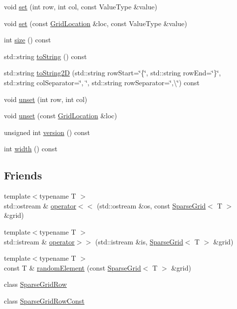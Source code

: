 \begin{DoxyCompactItemize}
\item 
void \mbox{\hyperlink{classSparseGrid_a6f5cee26d171f36d280a15c51332efc2}{set}} (int row, int col, const Value\+Type \&value)
\item 
void \mbox{\hyperlink{classSparseGrid_a02a61287a9aee6a1ff7e8a8325ce094d}{set}} (const \mbox{\hyperlink{structGridLocation}{Grid\+Location}} \&loc, const Value\+Type \&value)
\item 
int \mbox{\hyperlink{classSparseGrid_af9593d4a5ff4274efaf429cb4f9e57cc}{size}} () const
\item 
std\+::string \mbox{\hyperlink{classSparseGrid_a1fe5121d6528fdea3f243321b3fa3a49}{to\+String}} () const
\item 
std\+::string \mbox{\hyperlink{classSparseGrid_a8e636ad8b56218c7e0162d6c1bd78b39}{to\+String2D}} (std\+::string row\+Start=\char`\"{}\{\char`\"{}, std\+::string row\+End=\char`\"{}\}\char`\"{}, std\+::string col\+Separator=\char`\"{}, \char`\"{}, std\+::string row\+Separator=\char`\"{},\textbackslash{}\char`\"{}) const
\item 
void \mbox{\hyperlink{classSparseGrid_ae8cd7ce6866d5bccb4d900047b00a9f0}{unset}} (int row, int col)
\item 
void \mbox{\hyperlink{classSparseGrid_a6c6a0cedc17fead9553340c164db6eb3}{unset}} (const \mbox{\hyperlink{structGridLocation}{Grid\+Location}} \&loc)
\item 
unsigned int \mbox{\hyperlink{classSparseGrid_a0aa696ccb72cbf928535d6b646bac1aa}{version}} () const
\item 
int \mbox{\hyperlink{classSparseGrid_ad72663daf610f2a0833a2fc3d78e4fdf}{width}} () const
\end{DoxyCompactItemize}
\subsection*{Friends}
\begin{DoxyCompactItemize}
\item 
{\footnotesize template$<$typename T $>$ }\\std\+::ostream \& \mbox{\hyperlink{classSparseGrid_a9fbe60d6b428febe772a67368dc1ca64}{operator$<$$<$}} (std\+::ostream \&os, const \mbox{\hyperlink{classSparseGrid}{Sparse\+Grid}}$<$ T $>$ \&grid)
\item 
{\footnotesize template$<$typename T $>$ }\\std\+::istream \& \mbox{\hyperlink{classSparseGrid_abda71b3d47a0135d733ca823e577b6a0}{operator$>$$>$}} (std\+::istream \&is, \mbox{\hyperlink{classSparseGrid}{Sparse\+Grid}}$<$ T $>$ \&grid)
\item 
{\footnotesize template$<$typename T $>$ }\\const T \& \mbox{\hyperlink{classSparseGrid_adb322a887d81f108ab54909e1ceacc84}{random\+Element}} (const \mbox{\hyperlink{classSparseGrid}{Sparse\+Grid}}$<$ T $>$ \&grid)
\item 
class \mbox{\hyperlink{classSparseGrid_a7b596e3a8decb7689f3928f0846b5b74}{Sparse\+Grid\+Row}}
\item 
class \mbox{\hyperlink{classSparseGrid_adb9d25de8bb6fb2ec916926f16f49d68}{Sparse\+Grid\+Row\+Const}}
\end{DoxyCompactItemize}



